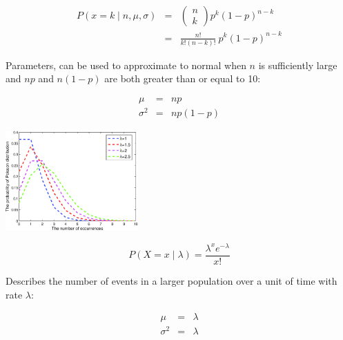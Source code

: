 \begin{eqnarray}
	P(x = k \mid n, \mu, \sigma) &=& \begin{pmatrix}
		n\\ 
		k
	\end{pmatrix}
	p^k (1 - p)^{n -k} \\
	&=& \frac{n!}{k!(n - k)!} ~p^k (1 - p)^{n - k} 
\end{eqnarray}

Parameters, can be used to approximate to normal when $n$ is sufficiently large and $np$ and $n(1-p)$ are both greater than or equal to 10:

\begin{eqnarray}
  \mu       &=& np \\
  \sigma^2  &=& np(1 - p)
\end{eqnarray}

\hformbar




\begin{center}
    \includegraphics[width=2in]{poisson}
\end{center}

\begin{equation}
	P(X = x \mid \lambda) = \frac{\lambda^x e^{-\lambda}}{x!}
\end{equation}

Describes the number of events in a larger population over a unit of time with rate $\lambda$:

\begin{eqnarray}
  \mu       &=& \lambda \\
  \sigma^2  &=& \lambda
\end{eqnarray}

\hformbar







%
%
%























